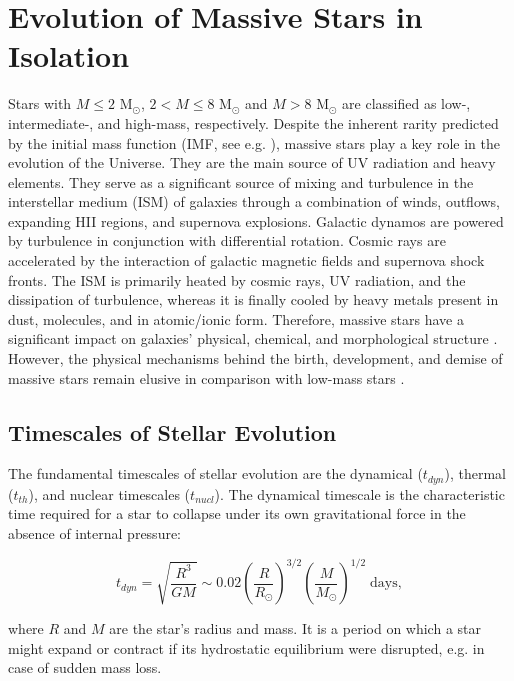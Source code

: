 \chapter{Evolution of Massive Stars in Isolation}\label{chap:single_star_evolution}

Stars with $M \leq 2$ M$_{\odot}$, $2 < M \leq 8$ M$_{\odot}$ and $M > 8$ M$_{\odot}$ are classified as low-, intermediate-, and high-mass, respectively. Despite the inherent rarity predicted by the initial mass function (IMF, see e.g. \cite{chabrier2005initial, dib2018emergence}), massive stars play a key role in the evolution of the Universe. They are the main source of UV radiation and heavy elements. They serve as a significant source of mixing and turbulence in the interstellar medium (ISM) of galaxies through a combination of winds, outflows, expanding HII regions, and supernova explosions. Galactic dynamos are powered by turbulence in conjunction with differential rotation. Cosmic rays are accelerated by the interaction of galactic magnetic fields and supernova shock fronts. The ISM is primarily heated by cosmic rays, UV radiation, and the dissipation of turbulence, whereas it is finally cooled by heavy metals present in dust, molecules, and in atomic/ionic form. Therefore, massive stars have a significant impact on galaxies' physical, chemical, and morphological structure \citep{kennicutt2005role}. However, the physical mechanisms behind the birth, development, and demise of massive stars remain elusive in comparison with low-mass stars \citep{zinnecker2007toward}. 


\section{Timescales of Stellar Evolution}

The fundamental timescales of stellar evolution are the dynamical ($t_{dyn}$), thermal ($t_{th}$), and nuclear timescales ($t_{nucl}$). The dynamical timescale is the characteristic time required for a star to collapse under its own gravitational force in the absence of internal pressure:

\begin{equation}
    t_{dyn} = \sqrt{\frac{R^3}{GM}} \sim 0.02 \left( \frac{R}{R_{\odot}} \right)^{3/2} \left( \frac{M}{M_{\odot}}\right)^{1/2} \; \text{days},
\end{equation}\label{eq:dynamical_timsecale}

where $R$ and $M$ are the star's radius and mass. It is a period on which a star might expand or contract if its hydrostatic equilibrium were disrupted, e.g. in case of sudden mass loss.

